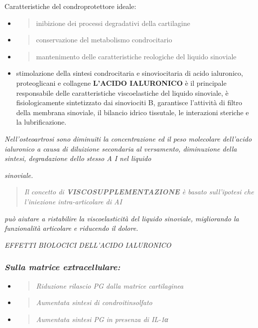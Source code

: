 \documentclass[]{article}
\begin{document}
Caratteristiche del condroprotettore ideale:

\begin{itemize}
\item
  \begin{quote}
  inibizione dei processi degradativi della cartilagine
  \end{quote}
\item
  \begin{quote}
  conservazione del metabolismo condrocitario
  \end{quote}
\item
  \begin{quote}
  mantenimento delle caratteristiche reologiche del liquido sinoviale
  \end{quote}
\item
  stimolazione della sintesi condrocitaria e sinoviocitaria di acido
  ialuronico, proteoglicani e collagene \textbf{L'ACIDO IALURONICO} è il
  principale responsabile delle caratteristiche viscoelastiche del
  liquido sinoviale, è fisiologicamente sintetizzato dai sinoviociti B,
  garantisce l'attività di filtro della membrana sinoviale, il bilancio
  idrico tissutale, le interazioni steriche e la lubrificazione.
\end{itemize}

\emph{Nell'osteoartrosi sono diminuiti la concentrazione ed il peso
molecolare dell'acido ialuronico a causa di diluizione secondaria al
versamento, diminuzione della sintesi, degradazione dello stesso A I nel
liquido}

\emph{sinoviale.}

\begin{quote}
\emph{Il concetto di \textbf{VISCOSUPPLEMENTAZIONE} è basato
sull'ipotesi che l'iniezione intra-articolare di AI}
\end{quote}

\emph{può aiutare a ristabilire la viscoelasticità del liquido
sinoviale, migliorando la funzionalità articolare e riducendo il
dolore.}

\emph{EFFETTI BIOLOCICI DELL'ACIDO IALURONICO}

\subsubsection{\texorpdfstring{\emph{Sulla matrice
extracellulare:}}{Sulla matrice extracellulare:}}\label{sulla-matrice-extracellulare}

\begin{itemize}
\item
  \begin{quote}
  \emph{Riduzione rilascio PG dalla matrice cartilaginea}
  \end{quote}
\item
  \begin{quote}
  \emph{Aumentata sintesi di condroitinsolfato}
  \end{quote}
\item
  \begin{quote}
  \emph{Aumentata sintesi PG in presenza di IL-1α}
  \end{quote}
\end{itemize}
\end{document}

